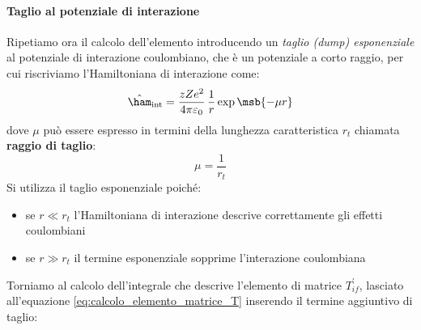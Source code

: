\paragraph{Taglio al potenziale di interazione} Ripetiamo ora il calcolo
dell'elemento introducendo un \textit{taglio (dump) esponenziale} al potenziale
di interazione coulombiano, che è un potenziale a corto raggio, per cui
riscriviamo l'Hamiltoniana di interazione come:
\begin{equation}
	\hat{\ham}_{\text{int}} = \frac{zZe^2}{4 \pi \varepsilon_0} \, \frac{1}{r}
	\exp\msb{-\mu r}
\end{equation}
dove $\mu$ può essere espresso in termini della lunghezza caratteristica $r_t$
chiamata \textbf{raggio di taglio}:
\begin{equation}
	\mu = \frac{1}{r_t}
\end{equation}
Si utilizza il taglio esponenziale poiché:
\begin{itemize}
	\item se $r \ll r_t$ l'Hamiltoniana di interazione descrive correttamente gli
	      effetti coulombiani
	\item se $r \gg r_t$ il termine esponenziale sopprime l'interazione
	      coulombiana
\end{itemize}
Torniamo al calcolo dell'integrale che descrive l'elemento di matrice
$T_{if}^\prime$, lasciato all'equazione \ref{eq:calcolo_elemento_matrice_T}
inserendo il termine aggiuntivo di taglio:
